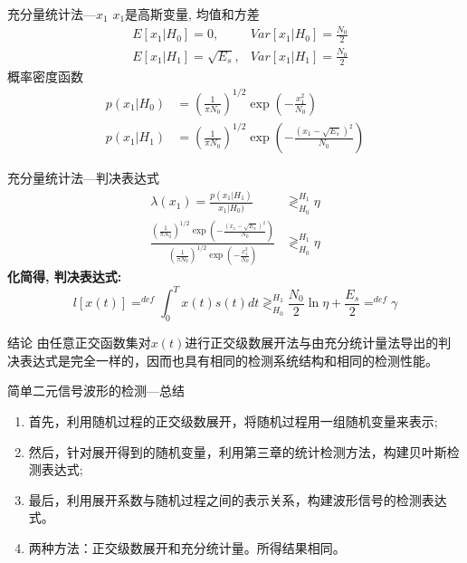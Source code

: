 \begin{frame}{充分量统计法---$x_1$}
$x_1$是高斯变量, 均值和方差
\begin{align*}
&E[x_1|H_0]=0,&Var[x_1|H_0]=\frac{N_0}{2}\\
&E[x_1|H_1]=\sqrt{E_s},&Var[x_1|H_1]=\frac{N_0}{2}
\end{align*}
概率密度函数
\begin{align*}
p(x_1|H_0)&=\left(\frac{1}{\pi N_0}\right)^{1/2}\exp\left(-\frac{x_1^2}{N_0}\right)\\
p(x_1|H_1)&=\left(\frac{1}{\pi N_0}\right)^{1/2}\exp\left(-\frac{(x_1-\sqrt{E_s})^2}{N_0}\right)
\end{align*}
\end{frame}

\begin{frame}{充分量统计法---判决表达式}
\begin{align*}
\lambda(x_1)=\frac{p(x_1|H_1)}{x_1|H_0)}&\mathop{\gtrless}_{H_0}^{H_1}\eta\\
\frac{\left(\frac{1}{\pi N_0}\right)^{1/2}\exp\left(-\frac{(x_1-\sqrt{E_s})^2}{N_0}\right)}{\left(\frac{1}{\pi N_0}\right)^{1/2}\exp\left(-\frac{x_1^2}{N_0}\right)}&\mathop{\gtrless}_{H_0}^{H_1}\eta
\end{align*}
\textbf{化简得, 判决表达式:}
\[l[x(t)]\mathop{=}^{def}\int_{0}^{T}x(t)s(t)dt\mathop{\gtrless}_{H_0}^{H_1}\frac{N_0}{2}\ln\eta+\frac{E_s}{2}\mathop{=}^{def}\gamma \]
\begin{block}{结论}
	由任意正交函数集对$x(t)$进行正交级数展开法与由充分统计量法导出的判决表达式是完全一样的，因而也具有相同的检测系统结构和相同的检测性能。
\end{block}
\end{frame}

\begin{frame}{简单二元信号波形的检测---总结}
\begin{enumerate}
	\setlength{\itemsep}{.5cm}
	\item 首先，利用随机过程的正交级数展开，将随机过程用一组随机变量来表示;
	\item 然后，针对展开得到的随机变量，利用第三章的统计检测方法，构建贝叶斯检测表达式;
	\item 最后，利用展开系数与随机过程之间的表示关系，构建波形信号的检测表达式。
	\item 两种方法：正交级数展开和充分统计量。所得结果相同。
\end{enumerate}
\end{frame}
